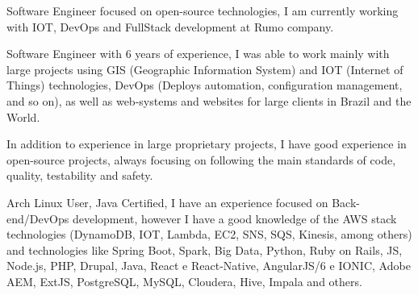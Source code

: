 

\begin{cvparagraph}

Software Engineer focused on open-source technologies, I am currently working with IOT, DevOps and FullStack development at Rumo company.

Software Engineer with 6 years of experience, I was able to work mainly with large projects using GIS (Geographic Information System) and IOT (Internet of Things) technologies, DevOps (Deploys automation, configuration management, and so on), as well as web-systems and websites for large clients in Brazil and the World.

In addition to experience in large proprietary projects, I have good experience in open-source projects, always focusing on following the main standards of code, quality, testability and safety.

Arch Linux User, Java Certified, I have an experience focused on Back-end/DevOps development, however I have a good knowledge of the AWS stack technologies (DynamoDB, IOT, Lambda, EC2, SNS, SQS, Kinesis, among others) and technologies like Spring Boot, Spark, Big Data, Python, Ruby on Rails, JS, Node.js, PHP, Drupal, Java, React e React-Native, AngularJS/6 e IONIC, Adobe AEM, ExtJS, PostgreSQL, MySQL, Cloudera, Hive, Impala and others.
\end{cvparagraph}
